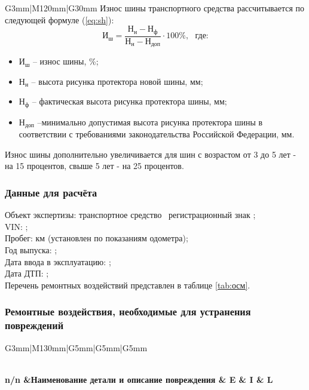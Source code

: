 \begin{longtable}{G{3mm}|M{120mm}|G{30mm}}
Износ шины транспортного средства рассчитывается по следующей формуле (\ref{eq:sh}):
\begin{equation}\label{eq:sh}
\text{И}_{\text{ш}} = \frac{\text{Н}_{\text{н}}-\text{Н}_{\text{ф}}}{\text{Н}_{\text{н}}-\text{Н}_{\text{доп}}} \cdot{100}\%,  \,\,\,\,\text{где:} 
\end{equation}
%
\begin{itemize}
	\item[ ] $ \text{И}_{\text{ш}} $ -- износ шины, \%;
	\item[ ] $ \text{Н}_{\text{н}} $ -- высота рисунка протектора новой шины, мм;
	\item[ ] $\text{Н}_{\text{ф}} $ -- фактическая высота рисунка протектора шины, мм;
	\item[ ] $ \text{Н}_{\text{доп}} $ --минимально допустимая высота рисунка протектора шины в соответствии с требованиями законодательства Российской Федерации, мм.
\end{itemize}
%
\vspace{5mm}
\relax
%
Износ шины дополнительно увеличивается для шин с возрастом от 3 до 5 лет - на 15 процентов, свыше 5 лет - на 25 процентов.

                                                 
\subsubsection{Данные для расчёта}

\noindent Объект экспертизы:  транспортное средство \tc\,
регистрационный знак ;\\ 
VIN: ;\\
Пробег:     км (установлен по показаниям одометра);\\
Год выпуска:     ;\\ 
Дата ввода в эксплуатацию:  ;\\
Дата ДТП:  ;\\
Перечень ремонтных воздействий представлен в таблице \ref{tab:осм}.

\subsubsection{Ремонтные воздействия, необходимые для устранения повреждений}

\setcounter{rownum}{0}

\begin{longtable}{G{3mm}|M{130mm}|G{5mm}|G{5mm}|G{5mm}}
	\caption[]{Таблица ремонтных воздействий, необходимых для устранения повреждений ТС , полученных в заявленных обстоятельствах}
	\label{tab:осм}\\
	\hline  \hline   \toprule 
	\bf  {\footnotesize  n/n}  &\bf {\small Наименование  детали и описание повреждения} & \bf {\small E} & \bf {\small I} & \bf {\small L}\\\hline \hline \toprule  \endhead 
	

\end{longtable}
\end{longtable}
